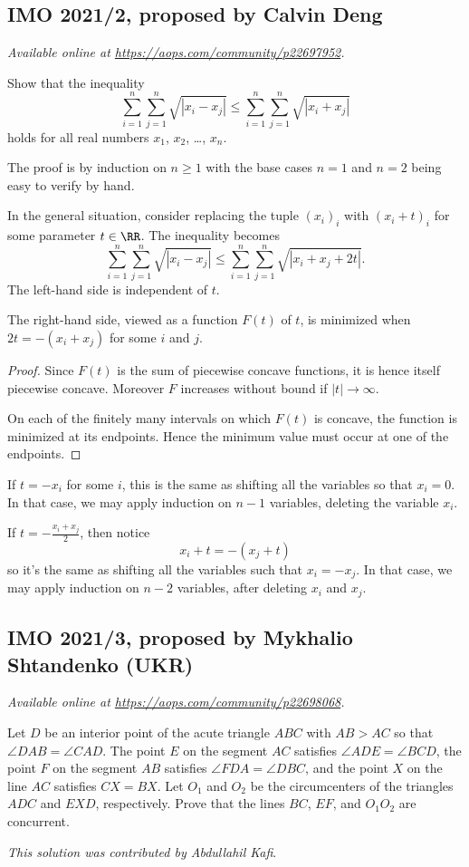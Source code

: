 \documentclass[11pt]{scrartcl}
\begin{document}
\subsection{IMO 2021/2, proposed by Calvin Deng}
\textsl{Available online at \url{https://aops.com/community/p22697952}.}
\begin{mdframed}[style=mdpurplebox,frametitle={Problem statement}]
Show that the inequality
\[\sum_{i=1}^n \sum_{j=1}^n \sqrt{|x_i-x_j|}
  \le \sum_{i=1}^n \sum_{j=1}^n \sqrt{|x_i+x_j|} \]
holds for all real numbers $x_1$, $x_2$, \dots, $x_n$.
\end{mdframed}
The proof is by induction on $n \ge 1$ with the base cases $n=1$ and
$n=2$ being easy to verify by hand.

In the general situation, consider replacing the tuple $(x_i)_i$
with $(x_i+t)_i$ for some parameter $t \in \RR$.
The inequality becomes
\[\sum_{i=1}^n \sum_{j=1}^n \sqrt{|x_i-x_j|}
  \le \sum_{i=1}^n \sum_{j=1}^n \sqrt{|x_i+x_j+2t|}. \]
The left-hand side is independent of $t$.
\begin{claim*}
  The right-hand side, viewed as a function $F(t)$ of $t$,
  is minimized when $2t = -(x_i + x_j)$ for some $i$ and $j$.
\end{claim*}
\begin{proof}
  Since $F(t)$ is the sum of piecewise concave functions,
  it is hence itself piecewise concave.
  Moreover $F$ increases without bound if $|t| \to \infty$.

  On each of the finitely many intervals on which $F(t)$ is
  concave, the function is minimized at its endpoints.
  Hence the minimum value must occur at one of the endpoints.
\end{proof}

If $t = -x_i$ for some $i$, this is the same as shifting all the
variables so that $x_i = 0$.
In that case, we may apply induction on $n-1$ variables,
deleting the variable $x_i$.

If $t = -\frac{x_i+x_j}{2}$, then notice
\[ x_i + t = -(x_j + t) \]
so it's the same as shifting all the variables such that $x_i = -x_j$.
In that case, we may apply induction on $n-2$ variables,
after deleting $x_i$ and $x_j$.
\pagebreak

\subsection{IMO 2021/3, proposed by Mykhalio Shtandenko (UKR)}
\textsl{Available online at \url{https://aops.com/community/p22698068}.}
\begin{mdframed}[style=mdpurplebox,frametitle={Problem statement}]
Let $D$ be an interior point of the acute triangle $ABC$
with $AB > AC$ so that $\angle DAB = \angle CAD$.
The point $E$ on the segment $AC$ satisfies $\angle ADE =\angle BCD$,
the point $F$ on the segment $AB$ satisfies $\angle FDA =\angle DBC$,
and the point $X$ on the line $AC$ satisfies $CX = BX$.
Let $O_1$ and $O_2$ be the circumcenters of the triangles
$ADC$ and $EXD$, respectively.
Prove that the lines $BC$, $EF$, and $O_1O_2$ are concurrent.
\end{mdframed}
\emph{This solution was contributed by Abdullahil Kafi}.
\end{document}
